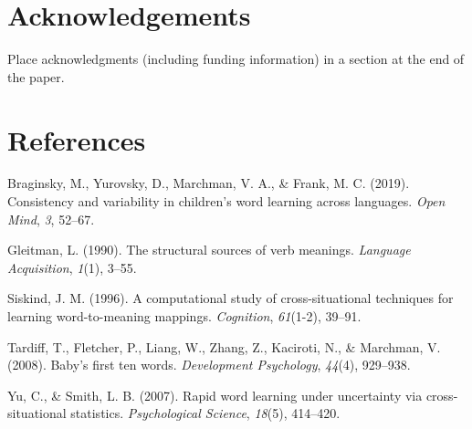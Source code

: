 \documentclass[10pt, letterpaper]{article}
\begin{document}
\hypertarget{acknowledgements}{%
\section{Acknowledgements}\label{acknowledgements}}

Place acknowledgments (including funding information) in a section at
the end of the paper.

\hypertarget{references}{%
\section{References}\label{references}}

\setlength{\parindent}{-0.1in} 
\setlength{\leftskip}{0.125in}

\noindent

\hypertarget{refs}{}
\leavevmode\hypertarget{ref-braginsky2019}{}%
Braginsky, M., Yurovsky, D., Marchman, V. A., \& Frank, M. C. (2019).
Consistency and variability in children's word learning across
languages. \emph{Open Mind}, \emph{3}, 52--67.

\leavevmode\hypertarget{ref-gleitman1990}{}%
Gleitman, L. (1990). The structural sources of verb meanings.
\emph{Language Acquisition}, \emph{1}(1), 3--55.

\leavevmode\hypertarget{ref-siskind1996}{}%
Siskind, J. M. (1996). A computational study of cross-situational
techniques for learning word-to-meaning mappings. \emph{Cognition},
\emph{61}(1-2), 39--91.

\leavevmode\hypertarget{ref-tardiff2008}{}%
Tardiff, T., Fletcher, P., Liang, W., Zhang, Z., Kaciroti, N., \&
Marchman, V. (2008). Baby's first ten words. \emph{Development
Psychology}, \emph{44}(4), 929--938.

\leavevmode\hypertarget{ref-yu2007}{}%
Yu, C., \& Smith, L. B. (2007). Rapid word learning under uncertainty
via cross-situational statistics. \emph{Psychological Science},
\emph{18}(5), 414--420.


\end{document}
